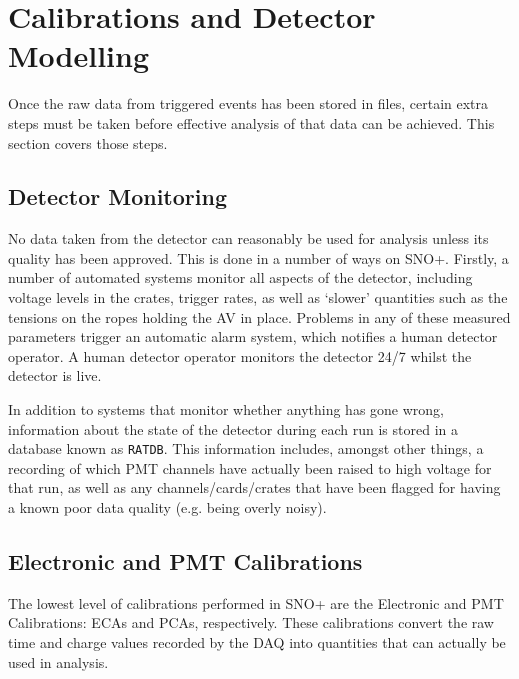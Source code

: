 \section{Calibrations and Detector Modelling}\label{sec:calibs_modelling}
Once the raw data from triggered events has been stored in files, certain extra steps must be taken before effective analysis of that data can be achieved. This section covers those steps.

\subsection{Detector Monitoring}
No data taken from the detector can reasonably be used for analysis unless its quality has been approved. This is done in a number of ways on SNO+. Firstly, a number of automated systems monitor all aspects of the detector, including voltage levels in the crates, trigger rates, as well as `slower' quantities such as the tensions on the ropes holding the AV in place. Problems in any of these measured parameters trigger an automatic alarm system, which notifies a human detector operator. A human detector operator monitors the detector 24/7 whilst the detector is live.

In addition to systems that monitor whether anything has gone wrong, information about the state of the detector during each run is stored in a database known as \texttt{RATDB}. This information includes, amongst other things, a recording of which PMT channels have actually been raised to high voltage for that run, as well as any channels/cards/crates that have been flagged for having a known poor data quality (e.g. being overly noisy).


\subsection{Electronic and PMT Calibrations}
The lowest level of calibrations performed in SNO+ are the Electronic and PMT Calibrations: ECAs and PCAs, respectively. These calibrations convert the raw time and charge values recorded by the DAQ into quantities that can actually be used in analysis.


